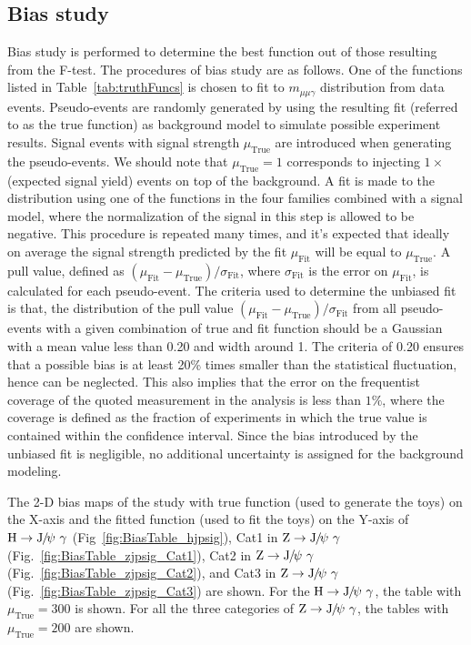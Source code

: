 		\subsection{Bias study}
		\label{sec:bias}
		Bias study is performed to determine the best function out of those resulting from the F-test. The procedures of bias study are as follows. One of the functions listed in Table~\ref{tab:truthFuncs} is chosen to fit to $m_{\mu\mu\gamma}$ distribution from data events.
		Pseudo-events are randomly generated by using the resulting fit (referred to as the true function) as background model to simulate possible experiment results. 
		Signal events with signal strength $\mu_{\text{True}}$ are introduced when generating the pseudo-events. We should note that $\mu_{\text{True}}=1$ corresponds to injecting $1\times$(expected signal yield) events on top of the background. A fit is made to the distribution using one of the functions in the four families combined with a signal model, where the normalization of the signal in this step is allowed to be negative. This procedure is repeated many times, and it's expected that ideally on average the signal strength predicted by the fit $\mu_{\text{Fit}}$ will be equal to $\mu_{\text{True}}$. A pull value, defined as $(\mu_{\text{Fit}}-\mu_{\text{True}})/\sigma_{\text{Fit}}$, where $\sigma_{\text{Fit}}$ is the error on $\mu_{\text{Fit}}$, is calculated for each pseudo-event.
		The criteria used to determine the unbiased fit is that, the distribution of the pull value $(\mu_{\text{Fit}}-\mu_{\text{True}})/\sigma_{\text{Fit}}$ from all pseudo-events with a given combination of true and fit function should be a Gaussian with a mean value less than 0.20 and width around 1. The criteria of 0.20 ensures that a possible bias is at least 20\% times smaller than the statistical fluctuation, hence can be neglected.
		This also implies that the error on the frequentist coverage of the quoted measurement in the analysis is less than $1\%$, where the coverage is defined as the fraction of experiments in which the true value is contained within the confidence interval.
		Since the bias introduced by the unbiased fit is negligible, no additional uncertainty is assigned for the background modeling.
		
		The 2-D bias maps of the study with true function (used to generate the toys) on the X-axis and the fitted function (used to fit the toys) on the Y-axis of $\PH\to\JPsi\ \gamma$ (Fig~\ref{fig:BiasTable_hjpsig}), Cat1 in $\mathrm{Z}\to{\mathrm{J}\hspace{-.08em}/\hspace{-.14em}\psi}\ \gamma$ (Fig.~\ref{fig:BiasTable_zjpsig_Cat1}), Cat2 in $\mathrm{Z}\to{\mathrm{J}\hspace{-.08em}/\hspace{-.14em}\psi}\ \gamma$ (Fig.~\ref{fig:BiasTable_zjpsig_Cat2}), and Cat3 in $\mathrm{Z}\to{\mathrm{J}\hspace{-.08em}/\hspace{-.14em}\psi}\ \gamma$ (Fig.~\ref{fig:BiasTable_zjpsig_Cat3}) are shown. For the $\PH\to\JPsi\ \gamma$, the table with $\mu_{\text{True}}=300$ is shown. For all the three categories of $\mathrm{Z}\to{\mathrm{J}\hspace{-.08em}/\hspace{-.14em}\psi}\ \gamma$, the tables with $\mu_{\text{True}}=200$ are shown.
		
